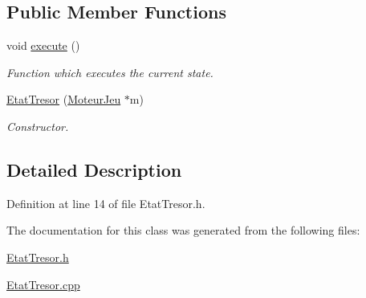 \subsection*{Public Member Functions}
\begin{DoxyCompactItemize}
\item 
\hypertarget{class_etat_tresor_a0b4e87ec6cf7715968c1bc9b75584e8e}{
void \hyperlink{class_etat_tresor_a0b4e87ec6cf7715968c1bc9b75584e8e}{execute} ()}
\label{class_etat_tresor_a0b4e87ec6cf7715968c1bc9b75584e8e}

\begin{DoxyCompactList}\small\item\em Function which executes the current state. \item\end{DoxyCompactList}\item 
\hypertarget{class_etat_tresor_a68e1328cf70b9c72b037c1130a6113e7}{
\hyperlink{class_etat_tresor_a68e1328cf70b9c72b037c1130a6113e7}{EtatTresor} (\hyperlink{class_moteur_jeu}{MoteurJeu} $\ast$m)}
\label{class_etat_tresor_a68e1328cf70b9c72b037c1130a6113e7}

\begin{DoxyCompactList}\small\item\em Constructor. \item\end{DoxyCompactList}\end{DoxyCompactItemize}


\subsection{Detailed Description}


Definition at line 14 of file EtatTresor.h.



The documentation for this class was generated from the following files:\begin{DoxyCompactItemize}
\item 
\hyperlink{_etat_tresor_8h}{EtatTresor.h}\item 
\hyperlink{_etat_tresor_8cpp}{EtatTresor.cpp}\end{DoxyCompactItemize}
